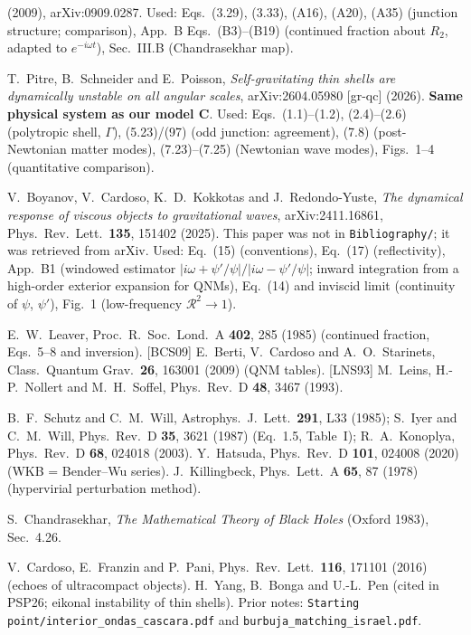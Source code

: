 \documentclass[11pt,a4paper]{article}
\numberwithin{equation}{section}
\begin{document}
\begin{description}
  (2009), arXiv:0909.0287. Used: Eqs.~(3.29), (3.33), (A16), (A20), (A35) (junction structure; comparison),
  App.~B Eqs.~(B3)--(B19) (continued fraction about $R_2$, adapted to $e^{-i\omega t}$), Sec.~III.B (Chandrasekhar map).
\item[{[PSP26]}] T.~Pitre, B.~Schneider and E.~Poisson, \emph{Self-gravitating thin shells are dynamically unstable on
  all angular scales}, arXiv:2604.05980 [gr-qc] (2026). \textbf{Same physical system as our model C}. Used:
  Eqs.~(1.1)--(1.2), (2.4)--(2.6) (polytropic shell, $\Gamma$), (5.23)/(97) (odd junction: agreement), (7.8)
  (post-Newtonian matter modes), (7.23)--(7.25) (Newtonian wave modes), Figs.~1--4 (quantitative comparison).
\item[{[BCKR24]}] V.~Boyanov, V.~Cardoso, K.~D.~Kokkotas and J.~Redondo-Yuste, \emph{The dynamical response of viscous
  objects to gravitational waves}, arXiv:2411.16861, Phys.\ Rev.\ Lett.\ \textbf{135}, 151402 (2025). This paper
  was not in \texttt{Bibliography/}; it was retrieved from arXiv. Used: Eq.~(15) (conventions), Eq.~(17)
  (reflectivity), App.~B1 (windowed estimator $|i\omega+\psi'/\psi|/|i\omega-\psi'/\psi|$; inward integration
  from a high-order exterior expansion for QNMs), Eq.~(14) and inviscid limit (continuity of $\psi$, $\psi'$),
  Fig.~1 (low-frequency $\mathcal R^2\to1$).
\item[{[L85]}] E.~W.~Leaver, Proc.\ R.\ Soc.\ Lond.\ A \textbf{402}, 285 (1985) (continued fraction, Eqs.~5--8 and
  inversion). [BCS09] E.~Berti, V.~Cardoso and A.~O.~Starinets, Class.\ Quantum Grav.\ \textbf{26}, 163001 (2009)
  (QNM tables). [LNS93] M.~Leins, H.-P.~Nollert and M.~H.~Soffel, Phys.\ Rev.\ D \textbf{48}, 3467 (1993).
\item[{[SW85, IW87, K03]}] B.~F.~Schutz and C.~M.~Will, Astrophys.\ J.\ Lett.\ \textbf{291}, L33 (1985);
  S.~Iyer and C.~M.~Will, Phys.\ Rev.\ D \textbf{35}, 3621 (1987) (Eq.~1.5, Table~I); R.~A.~Konoplya, Phys.\ Rev.\ D
  \textbf{68}, 024018 (2003). Y.~Hatsuda, Phys.\ Rev.\ D \textbf{101}, 024008 (2020) (WKB = Bender--Wu series).
  J.~Killingbeck, Phys.\ Lett.\ A \textbf{65}, 87 (1978) (hypervirial perturbation method).
\item[{[C83]}] S.~Chandrasekhar, \emph{The Mathematical Theory of Black Holes} (Oxford 1983), Sec.~4.26.
\item[{Other}] V.~Cardoso, E.~Franzin and P.~Pani, Phys.\ Rev.\ Lett.\ \textbf{116}, 171101 (2016) (echoes of
  ultracompact objects). H.~Yang, B.~Bonga and U.-L.~Pen (cited in PSP26; eikonal instability of thin shells).
  Prior notes: \texttt{Starting point/interior\_ondas\_cascara.pdf} and \texttt{burbuja\_matching\_israel.pdf}.
\end{description}
\end{document}
